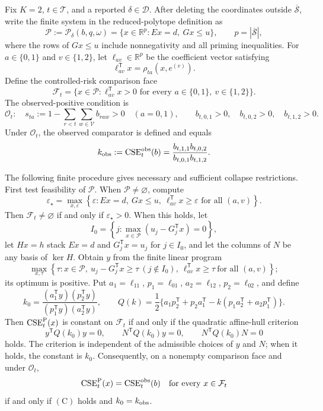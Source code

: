 Fix \(K=2\), \(t\in\mathcal T\), and a reported \(\delta\in\mathcal D\).  After deleting the coordinates outside \(\overline{\mathcal S}\), write the finite system in the reduced-polytope definition as
\[
 \mathcal P:=\mathcal P_\delta(b,q,\omega)
   =\{x\in\mathbb R^p:E x=d,\ Gx\leq u\},
 \qquad p=|\overline{\mathcal S}|,
\]
where the rows of \(Gx\leq u\) include nonnegativity and all priming inequalities.  For \(a\in\{0,1\}\) and \(v\in\{1,2\}\), let \(\ell_{av}\in\mathbb R^p\) be the coefficient vector satisfying
\[
 \ell_{av}^{\mathsf T}x=\rho_{ta}(x,e^{(v)}).
\]
Define the controlled-risk comparison face
\[
 \mathcal F_t=\{x\in\mathcal P:\ell_{av}^{\mathsf T}x>0
                    \text{ for every }a\in\{0,1\},\ v\in\{1,2\}\}.
\]
The observed-positive condition is
\[
 \mathcal O_t:\quad
 s_{ta}:=1-\sum_{r<t}\sum_{w\in\mathcal V}b_{raw}>0
 \quad(a=0,1),
 \qquad b_{t,0,1}>0,\quad b_{t,0,2}>0,\quad b_{t,1,2}>0.
\]
Under \(\mathcal O_t\), the observed comparator is defined and equals
\[
 k_{\rm obs}:=\operatorname{CSE}^{\rm obs}_t(b)
 =\frac{b_{t,1,1}b_{t,0,2}}{b_{t,0,1}b_{t,1,2}}.
\]

The following finite procedure gives necessary and sufficient collapse restrictions.  First test feasibility of \(\mathcal P\).  When \(\mathcal P\neq\varnothing\), compute
\[
 \varepsilon_\star=\max_{x,\varepsilon}\left\{\varepsilon:
 Ex=d,\ Gx\leq u,\ \ell_{av}^{\mathsf T}x\geq\varepsilon
 \text{ for all }(a,v)\right\}.
\]
Then \(\mathcal F_t\neq\varnothing\) if and only if \(\varepsilon_\star>0\).  When this holds, let
\[
 I_0=\left\{j:\max_{x\in\mathcal P}
       (u_j-G_j^{\mathsf T}x)=0\right\},
\]
let \(Hx=h\) stack \(Ex=d\) and \(G_j^{\mathsf T}x=u_j\) for \(j\in I_0\), and let the columns of \(N\) be any basis of \(\ker H\).  Obtain \(y\) from the finite linear program
\[
 \max_{x,\tau}\left\{\tau:x\in\mathcal P,\ 
 u_j-G_j^{\mathsf T}x\geq\tau\ (j\notin I_0),\ 
 \ell_{av}^{\mathsf T}x\geq\tau\ \text{for all }(a,v)\right\};
\]
its optimum is positive.  Put \(a_1=\ell_{11}\), \(p_1=\ell_{01}\), \(a_2=\ell_{12}\), \(p_2=\ell_{02}\), and define
\[
 k_0=\frac{(a_1^{\mathsf T}y)(p_2^{\mathsf T}y)}
 {(p_1^{\mathsf T}y)(a_2^{\mathsf T}y)},
 \qquad
 Q(k)=\frac12\{a_1p_2^{\mathsf T}+p_2a_1^{\mathsf T}
 -k(p_1a_2^{\mathsf T}+a_2p_1^{\mathsf T})\}.
\]
Then \(\operatorname{CSE}^{\rm P}_t(x)\) is constant on \(\mathcal F_t\) if and only if the quadratic affine-hull criterion
\[
 y^{\mathsf T}Q(k_0)y=0,\qquad
 N^{\mathsf T}Q(k_0)y=0,\qquad
 N^{\mathsf T}Q(k_0)N=0                                      \tag{C}
\]
holds.  The criterion is independent of the admissible choices of \(y\) and \(N\); when it holds, the constant is \(k_0\).  Consequently, on a nonempty comparison face and under \(\mathcal O_t\),
\[
 \operatorname{CSE}^{\rm P}_t(x)=\operatorname{CSE}^{\rm obs}_t(b)
 \quad\hbox{for every }x\in\mathcal F_t
\]
if and only if \((\mathrm C)\) holds and \(k_0=k_{\rm obs}\).

